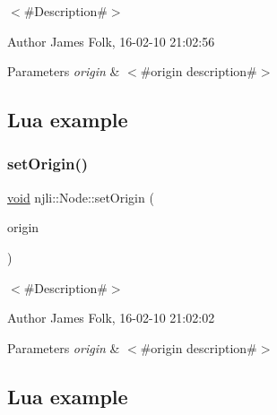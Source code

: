 $<$\#\+Description\#$>$ 

\begin{DoxyAuthor}{Author}
James Folk, 16-\/02-\/10 21\+:02\+:56
\end{DoxyAuthor}

\begin{DoxyParams}{Parameters}
{\em origin} & $<$\#origin description\#$>$\\
\hline
\end{DoxyParams}
\hypertarget{classnjli_1_1_steering_behavior_wander_ex1}{}\subsection{Lua example}\label{classnjli_1_1_steering_behavior_wander_ex1}

\begin{DoxyCodeInclude}
\end{DoxyCodeInclude}
\mbox{\label{classnjli_1_1_node_a4254472727081479bc1df40b9dc9c4f4}} 
\subsubsection{\texorpdfstring{set\+Origin()}{setOrigin()}\hspace{0.1cm}{\footnotesize\ttfamily [2/2]}}
{\footnotesize\ttfamily \mbox{\hyperlink{_thread_8h_af1e856da2e658414cb2456cb6f7ebc66}{void}} njli\+::\+Node\+::set\+Origin (\begin{DoxyParamCaption}\item[{const bt\+Vector2 \&}]{origin }\end{DoxyParamCaption})}



$<$\#\+Description\#$>$ 

\begin{DoxyAuthor}{Author}
James Folk, 16-\/02-\/10 21\+:02\+:02
\end{DoxyAuthor}

\begin{DoxyParams}{Parameters}
{\em origin} & $<$\#origin description\#$>$\\
\hline
\end{DoxyParams}
\hypertarget{classnjli_1_1_steering_behavior_wander_ex1}{}\subsection{Lua example}\label{classnjli_1_1_steering_behavior_wander_ex1}

